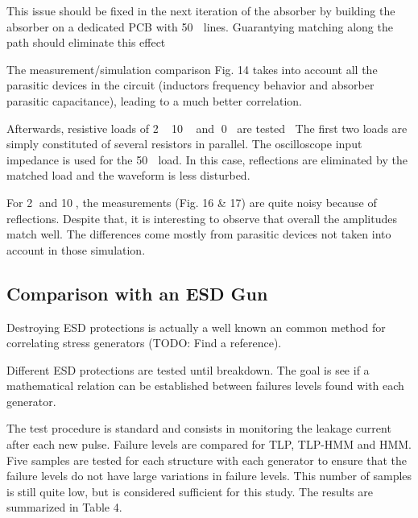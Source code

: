 

This issue should be fixed in the next iteration of the absorber by building the absorber on a dedicated PCB with 50  lines.
Guarantying matching along the path should eliminate this effect


The measurement/simulation comparison Fig. 14 takes into account all the parasitic devices in the circuit (inductors frequency behavior and absorber parasitic capacitance), leading to a much better correlation.

Afterwards, resistive loads of 2 10 and 0 are tested
The first two loads are simply constituted of several resistors in parallel.
The oscilloscope input impedance is used for the 50  load.
In this case, reflections are eliminated by the matched load and the waveform is less disturbed.

For 2 and 10, the measurements (Fig. 16 & 17) are quite noisy because of reflections.
Despite that, it is interesting to observe that overall the amplitudes match well.
The differences come mostly from parasitic devices not taken into account in those simulation.



\subsection{Comparison with an ESD Gun}

Destroying ESD protections is actually a well known an common method for correlating stress generators (TODO: Find a reference).

Different ESD protections are tested until breakdown.
The goal is see if a mathematical relation can be established between failures levels found with each generator.

The test procedure is standard and consists in monitoring the leakage current after each new pulse.
Failure levels are compared for TLP, TLP-HMM and HMM.
Five samples are tested for each structure with each generator to ensure that the failure levels do not have large variations in failure levels. This number of samples is still quite low, but is considered sufficient for this study.
The results are summarized in Table 4.

